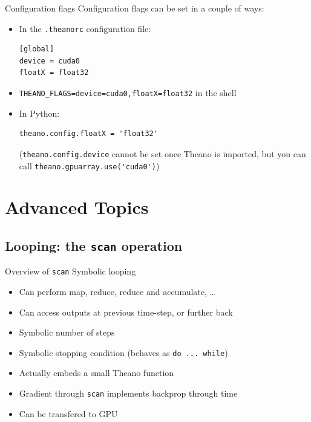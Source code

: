 \documentclass[a4paper,9pt]{beamer}
\begin{document}
\begin{frame}[fragile]{Configuration flags}
  Configuration flags can be set in a couple of ways:
  \begin{itemize}
    \item In the \verb|.theanorc| configuration file:
      \begin{verbatim}
[global]
device = cuda0
floatX = float32
      \end{verbatim}
    \item \verb|THEANO_FLAGS=device=cuda0,floatX=float32| in the shell
    \item In Python:
      \begin{verbatim}
theano.config.floatX = 'float32'
      \end{verbatim}
      (\verb|theano.config.device| cannot be set once Theano is imported, but you can call \verb|theano.gpuarray.use('cuda0')|)
  \end{itemize}
\end{frame}


\section{Advanced Topics}
\begin{frame}
  \tableofcontents[currentsection]
\end{frame}

\subsection{Looping: the \texttt{scan} operation}
\begin{frame}[fragile]{Overview of \texttt{scan}}
  Symbolic looping
  \begin{itemize}
    \item Can perform map, reduce, reduce and accumulate, \ldots
    \item Can access outputs at previous time-step, or further back
    \item Symbolic number of steps
    \item Symbolic stopping condition (behaves as \verb|do ... while|)
    \item Actually embeds a small Theano function
    \item Gradient through \verb|scan| implements backprop through time
    \item Can be transfered to GPU
  \end{itemize}
\end{frame}
\end{document}
